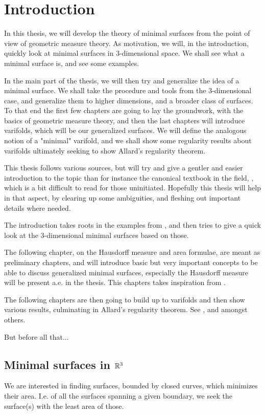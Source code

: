 \chapter{Introduction}

In this thesis, we will develop the theory of minimal surfaces from the point of view of geometric measure theory. As motivation, we will, in the introduction, quickly look at minimal surfaces in $3$-dimensional space. We shall see what a minimal surface is, and see some examples.

In the main part of the thesis, we will then try and generalize the idea of a minimal surface. We shall take the procedure and tools from the 3-dimensional case, and generalize them to higher dimensions, and a broader class of surfaces. To that end the first few chapters are going to lay the groundwork, with the basics of geometric measure theory, and then the last chapters will introduce varifolds, which will be our generalized surfaces. We will define the analogous notion of a "minimal" varifold, and we shall show some regularity results about varifolds ultimately seeking to show Allard's regularity theorem.

This thesis follows various sources, but will try and give a gentler and easier introduction to the topic than for instance the canonical textbook in the field, \cite{simon2014introduction}, which is a bit difficult to read for those uninitiated. Hopefully this thesis will help in that aspect, by clearing up some ambiguities, and fleshing out important details where needed.

The introduction takes roots in the examples from \cite{holopainen15}, and then tries to give a quick look at the 3-dimensional minimal surfaces based on those.

The following chapter, on the Hausdorff measure and area formulae, are meant as preliminary chapters, and will introduce basic but very important concepts to be able to discuss generalized minimal surfaces, especially the Hausdorff measure will be present a.e. in the thesis. This chapters takes inspiration from \cite{holopainen16}.

The following chapters are then going to build up to varifolds and then show various results, culminating in Allard's regularity theorem. See \cite{holopainen16}, \cite{simon2014introduction} and \cite{DeL12} amongst others.

But before all that...

\section{Minimal surfaces in $\mathbb{R}^3$}
We are interested in finding surfaces, bounded by closed curves, which minimizes their area. I.e. of all the surfaces spanning a given boundary, we seek the surface(s) with the least area of those.

